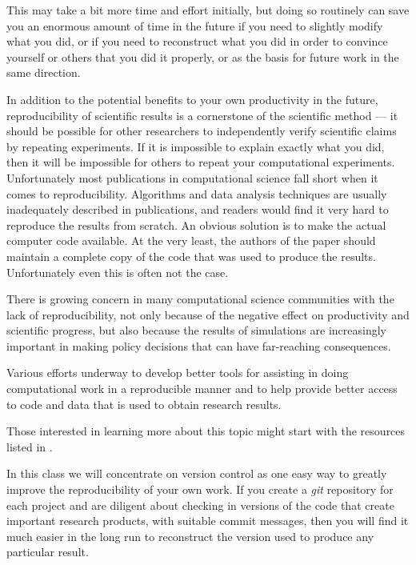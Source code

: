 \documentclass[letterpaper,10pt,english]{sphinxmanual}
\begin{document}
This may take a bit more time and effort initially, but doing so routinely
can save you an enormous amount of time in the future if you need to
slightly modify what you did, or if you need to reconstruct what you did
in order to convince yourself or others that you did it properly, or as the
basis for future work in the same direction.

In addition to the potential benefits to your own productivity in the
future, reproducibility of scientific results is a cornerstone of the
scientific method --- it should be possible for other researchers to
independently verify scientific claims by repeating experiments.  If it is
impossible to explain exactly what you did, then it will be impossible for
others to repeat your computational experiments.  Unfortunately most
publications in computational science fall short when it comes to
reproducibility.  Algorithms and data analysis techniques are usually
inadequately described in publications, and readers would find it very hard
to reproduce the results from scratch.  An obvious solution is to make the
actual computer code available.  At the very least, the authors of the paper
should maintain a complete copy of the code that was used to produce the
results.  Unfortunately even this is often not the case.

There is growing concern in many computational science communities with the
lack of reproducibility, not only because of the negative effect on
productivity and scientific progress, but also because the results of
simulations are increasingly important in making policy decisions that can
have far-reaching consequences.

Various efforts underway to develop better tools
for assisting in doing computational work in a reproducible manner and to
help provide better access to code and data that is used to obtain
research results.

Those interested in learning more about this topic might start with the
resources listed in {\hyperref[biblio:biblio\string-repro]{}}.

In this class we will concentrate on version control as one easy way to
greatly improve the reproducibility of your own work.  If you create a \emph{git}
repository for each project and are diligent about checking in versions of
the code that create important research products, with suitable commit
messages, then you will find it much easier in the long run to reconstruct
the version used to produce any particular result.
\end{document}
